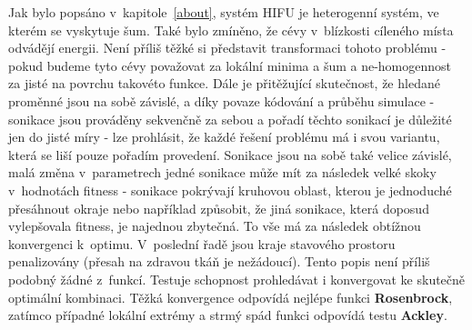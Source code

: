 Jak bylo popsáno v~kapitole~\ref{about}, systém HIFU je heterogenní systém, ve kterém se vyskytuje šum. Také bylo zmíněno, že cévy v~blízkosti cíleného místa odvádějí energii. Není příliš těžké si představit transformaci tohoto problému - pokud budeme tyto cévy považovat za lokální minima a šum a ne-homogennost za jisté  na povrchu takovéto funkce. Dále je přitěžující skutečnost, že hledané proměnné jsou na sobě závislé, a díky povaze kódování a průběhu simulace - sonikace jsou prováděny sekvenčně za sebou a pořadí těchto sonikací je důležité jen do jisté míry - lze prohlásit, že každé řešení problému má i svou variantu, která se liší pouze pořadím provedení. Sonikace jsou na sobě také velice závislé, malá změna v~parametrech jedné sonikace může mít za následek velké skoky v~hodnotách fitness - sonikace pokrývají kruhovou oblast, kterou je jednoduché přesáhnout okraje nebo například způsobit, že jiná sonikace, která doposud vylepšovala fitness, je najednou zbytečná. To vše má za následek obtížnou konvergenci k~optimu. V~poslední řadě jsou kraje stavového prostoru penalizovány (přesah na zdravou tkáň je nežádoucí). Tento popis není příliš podobný žádné z~funkcí. Testuje schopnost prohledávat i konvergovat ke skutečně optimální kombinaci. Těžká konvergence odpovídá nejlépe funkci \textbf{Rosenbrock}, zatímco případné lokální extrémy a strmý spád funkci odpovídá testu \textbf{Ackley}. 

